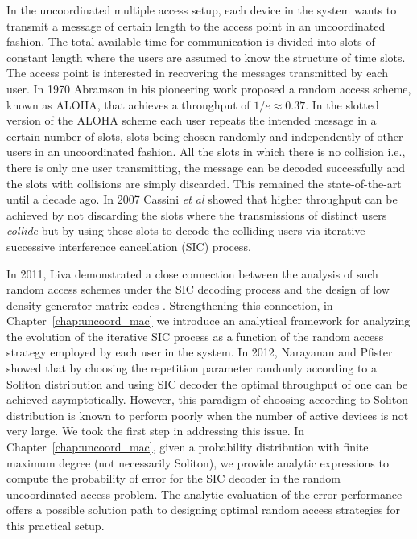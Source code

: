 In the uncoordinated multiple access setup, each device in the system wants to transmit a message of certain length to the access point in an uncoordinated fashion. The total available time for communication is divided into slots of constant length where the users are assumed to know the structure of time slots. The access point is interested in recovering the messages transmitted by each user. In 1970 Abramson in his pioneering work \cite{abramson1970aloha} proposed a random access scheme, known as ALOHA, that achieves a throughput of $1/e\approx 0.37$. In the slotted version of the ALOHA scheme each user repeats the intended message in a certain number of slots, slots being chosen randomly and independently of other users in an uncoordinated fashion. All the slots in which there is no collision i.e., there is only one user transmitting, the message can be decoded successfully and the slots with collisions are simply discarded. This remained the state-of-the-art until a decade ago. In 2007 \cite{casini2007contention} Cassini \textit{et al} showed that higher throughput can be achieved by not discarding the slots where the transmissions of distinct users \textit{collide} but by using these slots to decode the colliding users via iterative successive interference cancellation (SIC) process. 

In 2011, Liva demonstrated a close connection between the analysis of such random access schemes under the SIC decoding process and the design of low density generator matrix codes \cite{liva2011graph}. Strengthening this connection, in Chapter~\ref{chap:uncoord_mac} we introduce an analytical framework for analyzing the evolution of the iterative SIC process as a function of the random access strategy employed by each user in the system. In 2012, Narayanan and Pfister showed that by choosing the repetition parameter randomly according to a Soliton distribution and using SIC decoder the optimal throughput of one can be achieved asymptotically\cite{narayanan2012iterative}. However, this paradigm of choosing according to Soliton distribution is known to perform poorly when the number of active devices is not very large. We took the first step in addressing this issue. In Chapter~\ref{chap:uncoord_mac}, given a probability distribution with finite maximum degree (not necessarily Soliton),  we provide analytic expressions to compute the probability of error for the SIC decoder in the random uncoordinated access problem. The analytic evaluation of the error performance offers a possible solution path to designing optimal random access strategies for this practical setup.

